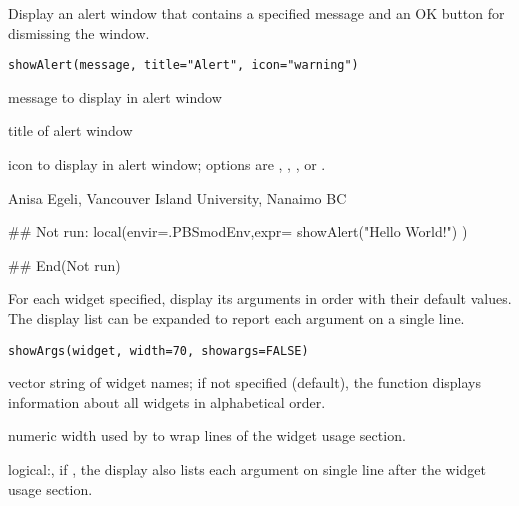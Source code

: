 \documentclass[letterpaper]{book}
\begin{document}
%
\begin{Description}\relax
Display an alert window that contains a specified message and 
an OK button for dismissing the window.
\end{Description}
%
\begin{Usage}
\begin{verbatim}
showAlert(message, title="Alert", icon="warning")
\end{verbatim}
\end{Usage}
%
\begin{Arguments}
\begin{ldescription}
\item[\code{message}] message to display in alert window
\item[\code{title}] title of alert window
\item[\code{icon}] icon to display in alert window; options are 
, , , or .
\end{ldescription}
\end{Arguments}
%
\begin{Author}\relax
Anisa Egeli, Vancouver Island University, Nanaimo BC
\end{Author}
%
\begin{SeeAlso}\relax
{}
\end{SeeAlso}
%
\begin{Examples}
\begin{ExampleCode}
## Not run: 
local(envir=.PBSmodEnv,expr={
  showAlert("Hello World!")
})

## End(Not run)
\end{ExampleCode}
\end{Examples}
%
\begin{Description}\relax
For each widget specified, display its arguments in order with their default values. 
The display list can be expanded to report each argument on a single line.
\end{Description}
%
\begin{Usage}
\begin{verbatim}
showArgs(widget, width=70, showargs=FALSE)
\end{verbatim}
\end{Usage}
%
\begin{Arguments}
\begin{ldescription}
\item[\code{widget}] vector string of widget names; if not specified (default), 
the function displays information about all widgets in alphabetical order.
\item[\code{width}] numeric width used by  to wrap lines of the widget
usage section.
\item[\code{showargs}] logical:, if , the display also lists each argument
on single line after the widget usage section.
\end{ldescription}
\end{Arguments}
\end{document}
